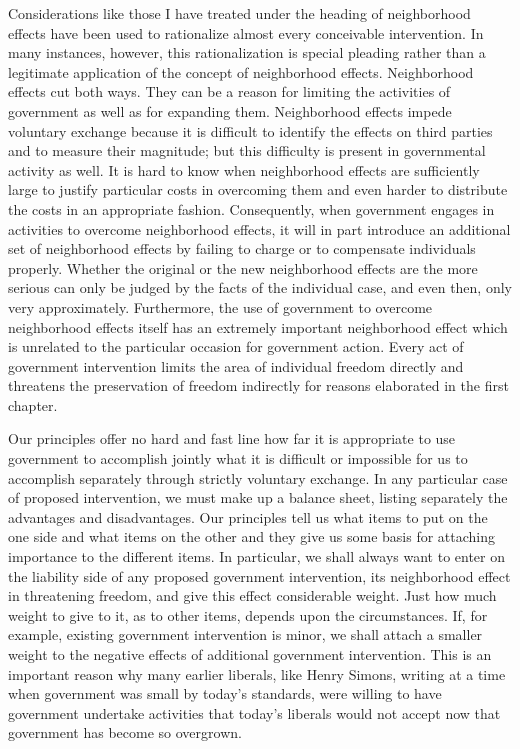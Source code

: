 \documentclass[11pt,openany]{book}
\begin{document}
Considerations like those I have treated under the heading of neighborhood effects have been used to rationalize almost every conceivable intervention. In many instances, however, this rationalization is special pleading rather than a legitimate application of the concept of neighborhood effects. Neighborhood effects cut both ways. They can be a reason for limiting the activities of government as well as for expanding them. Neighborhood effects impede voluntary exchange because it is difficult to identify the effects on third parties and to measure their magnitude; but this difficulty is present in governmental activity as well. It is hard to know when neighborhood effects are sufficiently large to justify particular costs in overcoming them and even harder to distribute the costs in an appropriate fashion. Consequently, when government engages in activities to overcome neighborhood effects, it will in part introduce an additional set of neighborhood effects by failing to charge or to compensate individuals properly. Whether the original or the new neighborhood effects are the more serious can only be judged by the facts of the individual case, and even then, only very approximately. Furthermore, the use of government to overcome neighborhood effects itself has an extremely important neighborhood effect which is unrelated to the particular occasion for government action. Every act of government intervention limits the area of individual freedom directly and threatens the preservation of freedom indirectly for reasons elaborated in the first chapter.

Our principles offer no hard and fast line how far it is appropriate to use government to accomplish jointly what it is difficult or impossible for us to accomplish separately through strictly voluntary exchange. In any particular case of proposed intervention, we must make up a balance sheet, listing separately the advantages and disadvantages. Our principles tell us what items to put on the one side and what items on the other and they give us some basis for attaching importance to the different items. In particular, we shall always want to enter on the liability side of any proposed government intervention, its neighborhood effect in threatening freedom, and give this effect considerable weight. Just how much weight to give to it, as to other items, depends upon the circumstances. If, for example, existing government intervention is minor, we shall attach a smaller weight to the negative effects of additional government intervention. This is an important reason why many earlier liberals, like Henry Simons, writing at a time when government was small by today's standards, were willing to have government undertake activities that today's liberals would not accept now that government has become so overgrown.
\end{document}
